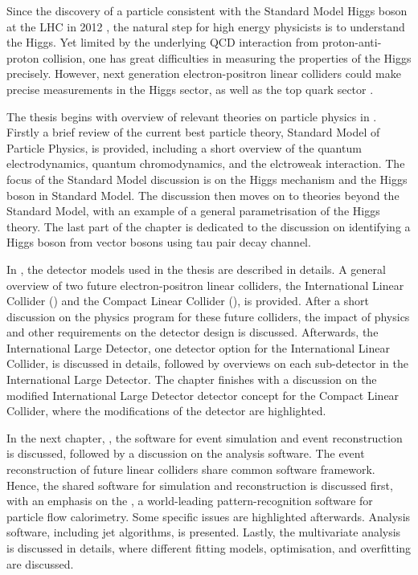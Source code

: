 Since the discovery of a particle consistent with the Standard Model Higgs boson at the LHC in 2012 \cite{Aad:2012tfa,Chatrchyan:2012ufa}, the natural step for high energy physicists is to understand the Higgs. Yet limited by the underlying QCD interaction from proton-anti-proton collision, one has great difficulties in measuring the properties of the Higgs precisely. However, next generation electron-positron linear colliders could make precise measurements in the Higgs sector, as well as the top quark sector \cite{Brau:2007zza,Linssen:2012hp}.


The thesis begins with overview of relevant theories on particle physics in .  Firstly a brief review of the   current best particle theory, Standard Model of Particle Physics, is provided, including a short overview of the quantum electrodynamics, quantum chromodynamics, and the elctroweak interaction. The focus of the Standard Model discussion is on the  Higgs mechanism and the Higgs boson in Standard Model. The discussion then moves on to theories beyond the Standard Model, with an example of   a general parametrisation of the Higgs theory. The last part of the chapter is dedicated to the discussion on identifying a Higgs boson from vector bosons using tau pair decay channel.


In , the detector models used in the thesis are described in details. A general overview of two future electron-positron linear colliders, the International Linear Collider (\ILC) and the Compact Linear Collider (\CLIC), is provided. After a short discussion on the physics program for these future colliders, the impact of physics and other requirements on the detector design is discussed. Afterwards, the International Large Detector, one detector option for the International Linear Collider, is discussed in details, followed by overviews on each sub-detector in the International Large Detector. The chapter finishes with a discussion on the modified International Large Detector detector concept for the Compact Linear Collider, where the modifications of the detector are highlighted.

In the next chapter, , the software for event simulation and event reconstruction is  discussed, followed by a discussion on the analysis software. The event reconstruction of future linear colliders share common software framework. Hence, the shared software for simulation and reconstruction is discussed first, with an emphasis on the \pandora, a world-leading pattern-recognition software for particle flow calorimetry. Some \CLIC specific issues are highlighted afterwards. Analysis software, including jet algorithms, is presented. Lastly, the multivariate analysis is discussed in details, where different fitting models, optimisation, and overfitting are discussed.


